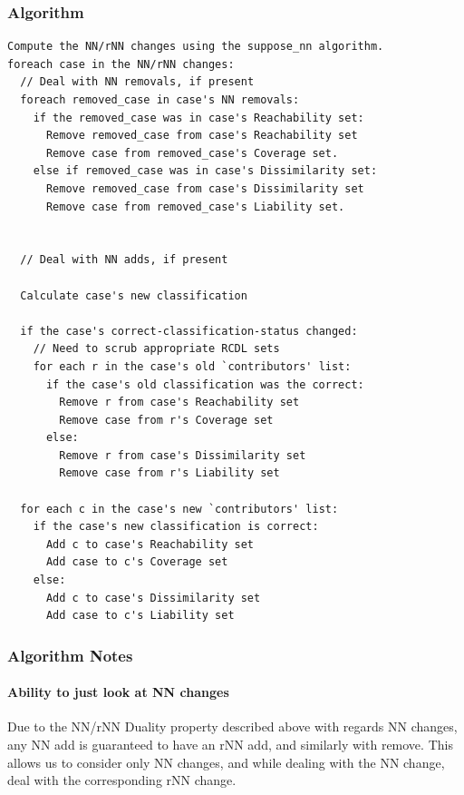 \documentclass[a4paper,11pt]{report}
\begin{document}
\begin{samepage}

\subsubsection{Algorithm}
{\small 
\begin{verbatim}
Compute the NN/rNN changes using the suppose_nn algorithm.
foreach case in the NN/rNN changes:
  // Deal with NN removals, if present
  foreach removed_case in case's NN removals:
    if the removed_case was in case's Reachability set:
      Remove removed_case from case's Reachability set
      Remove case from removed_case's Coverage set.
    else if removed_case was in case's Dissimilarity set:
      Remove removed_case from case's Dissimilarity set
      Remove case from removed_case's Liability set.


  // Deal with NN adds, if present  
  
  Calculate case's new classification
  
  if the case's correct-classification-status changed:
    // Need to scrub appropriate RCDL sets
    for each r in the case's old `contributors' list:
      if the case's old classification was the correct:
        Remove r from case's Reachability set
        Remove case from r's Coverage set
      else:
        Remove r from case's Dissimilarity set
        Remove case from r's Liability set
        
  for each c in the case's new `contributors' list:
    if the case's new classification is correct:
      Add c to case's Reachability set
      Add case to c's Coverage set
    else:
      Add c to case's Dissimilarity set
      Add case to c's Liability set

\end{verbatim}
}
\end{samepage}

\subsubsection{Algorithm Notes}
\paragraph{Ability to just look at NN changes}
Due to the NN/rNN Duality property described above with regards NN changes, any NN add is guaranteed to have an rNN add, and similarly with remove. This allows us to consider only NN changes, and while dealing with the NN change, deal with the corresponding rNN change.
\end{document}
